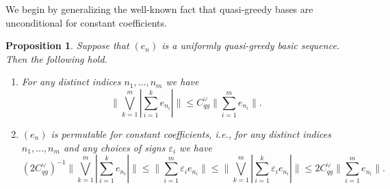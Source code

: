 \documentclass[12pt,leqno]{amsart}
\newtheorem{proposition}[theorem]{Proposition}
\numberwithin{equation}{section}
\theoremstyle{definition}
\def\N{{\mathbb N}}
\begin{document}
 We begin by generalizing the well-known fact that quasi-greedy bases are unconditional for constant coefficients.
\begin{proposition}\label{almost unc}
Suppose that $(e_n)$ is a uniformly quasi-greedy basic sequence. Then the following hold.
\begin{enumerate}
\item For any distinct indices $n_1,\dots, n_m$ we have
$$\bigg\|\bigvee_{k=1}^m\left|\sum_{i=1}^ke_{n_{i}}\right|\bigg\|\leq C_{qg}^\vee\bigg\|\sum_{i=1}^me_{n_i}\bigg\|.$$

\item $(e_n)$ is permutable for constant coefficients, i.e., for any distinct indices $n_1,\dots, n_m$ and any choices of signs $\varepsilon_i$ we have 
$$(2C_{qg}^\vee )^{-1}\bigg\|\bigvee_{k=1}^m\left|\sum_{i=1}^k e_{n_i}\right|\bigg\|\leq \bigg\|\sum_{i=1}^m\varepsilon_i e_{n_i}\bigg\|\leq \bigg\|\bigvee_{k=1}^m\left|\sum_{i=1}^k \varepsilon_ie_{n_i}\right|\bigg\|\leq 2C_{qg}^\vee \bigg\|\sum_{i=1}^me_{n_i}\bigg\|.$$
\end{enumerate}
\end{proposition}
\end{document}
